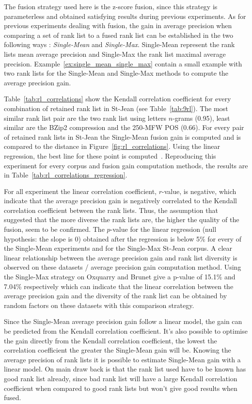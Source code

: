 The fusion strategy used here is the z-score fusion, since this strategy is parameterless and obtained satisfying results during previous experiments.
As for previous experiments dealing with fusion, the gain in average precision when comparing a set of rank list to a fused rank list can be established in the two following ways : \textit{Single-Mean} and \textit{Single-Max}.
Single-Mean represent the rank lists mean average precision and Single-Max the rank list maximal average precision.
Example~\ref{ex:single_mean_single_max} contain a small example with two rank lists for the Single-Mean and Single-Max methods to compute the average precision gain.

Table~\ref{tab:rl_correlations} show the Kendall correlation coefficient for every combination of retained rank list in St-Jean (see Table~\ref{tab:9rl}).
The most similar rank list pair are the two rank list using letters $n$-grams (0.95), least similar are the BZip2 compression and the 250-MFW POS (0.66).
For every pair of retained rank lists in St-Jean the Single-Mean fusion gain is computed and is compared to the distance in Figure~\ref{fig:rl_correlations}.
Using the linear regression, the best line for these point is computed~\cite{scipy}.
Reproducing this experiment for every corpus and fusion gain computation methods, the results are in Table~\ref{tab:rl_correlations_regression}.

For all experiment the linear correlation coefficient, $r$-value, is negative, which indicate that the average precision gain is negatively correlated to the Kendall correlation coefficient between the rank lists.
Thus, the assumption that suggested that the more diverse the rank lists are, the higher the quality of the fusion, seem to be confirmed.
The $p$-value for the linear regression (null hypothesis: the slope is 0) obtained after the regression is below 5\% for every of the Single-Mean experiments and for the Single-Max St-Jean corpus.
A clear linear relationship between the average precision gain and rank list diversity is observed on these datasets / average precision gain computation method.
Using the Single-Max strategy on Oxquarry and Brunet give a p-value of 15.1\% and 7.04\% respectively which can indicate that the linear correlation between the average precision gain and the diversity of the rank list can be obtained by random factors on these datasets with this comparison strategy.

Since the Single-Mean average precision gain follow a linear model, the gain can be predicted from the Kendall correlation coefficient. It's also possible to optimise the gain directly from the Kendall correlation coefficient, the lowest the correlation coefficient the greater the Single-Mean gain will be.
Knowing the average precision of rank lists it is possible to estimate Single-Mean gain with a linear model.
On main draw back is that the rank list used have to be known has good rank list already, since bad rank list will have a large Kendall correlation coefficient when compared to good rank lists but won't give good results when fused.

